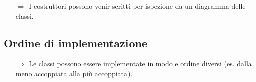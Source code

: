 
\begin{itemize}
    \item [$\Rightarrow$] I costruttori possono venir scritti per ispezione
    da un diagramma delle classi.
\end{itemize}


\subsection{Ordine di implementazione}

\begin{itemize}
    \item [$\Rightarrow$] Le classi possono essere implementate in modo e 
    ordine diversi (es. dalla meno accoppiata alla più accoppiata).
\end{itemize}


